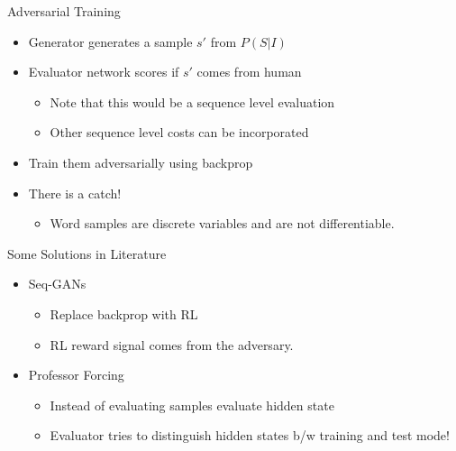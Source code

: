 \documentclass{beamer}
\begin{document}
\begin{frame}{Adversarial Training}
    \begin{itemize}
        \item Generator generates a sample $s'$ from $P(S|I)$
        \item Evaluator network scores if $s'$ comes from human 
            \begin{itemize}
                \item Note that this would be a sequence level evaluation
                \item Other sequence level costs can be incorporated
            \end{itemize}
        \item Train them adversarially using backprop
        \item There is a catch! 
            \begin{itemize}
                \item Word samples are discrete variables and are not differentiable.
            \end{itemize}
    \end{itemize}
\end{frame}
\begin{frame}{Some Solutions in Literature}
    \begin{itemize}
        \item Seq-GANs~\cite{yu2016seqgan} 
            \begin{itemize}
                \item Replace backprop with RL 
                \item RL reward signal comes from the adversary.
            \end{itemize}
        \item Professor Forcing~\cite{lamb2016professor}
            \begin{itemize}
                \item Instead of evaluating samples evaluate hidden state
                \item Evaluator tries to distinguish hidden states b/w training and test mode!
            \end{itemize}
     \end{itemize}
\end{frame}
\end{document}
